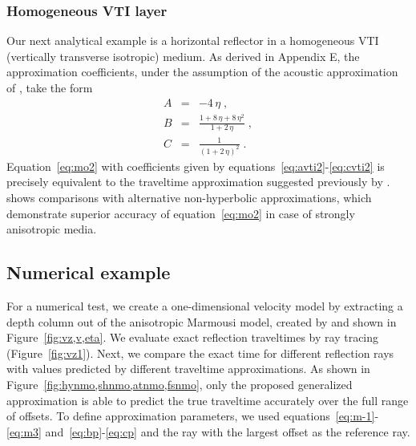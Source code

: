 
\subsubsection{Homogeneous VTI layer}

Our next analytical example is a horizontal reflector in a homogeneous
VTI (vertically transverse isotropic) medium. As derived in Appendix
E, the approximation coefficients, under the assumption of the
acoustic approximation of \cite{GEO63-02-06230631}, take the form
\begin{eqnarray}
\label{eq:avti2}
A & = & -4\,\eta\;, \\
\label{eq:bvti2}
B & = & \frac{1 + 8\,\eta + 8\,\eta^2}{1 + 2\,\eta}\;, \\
\label{eq:cvti2}
C & = & \frac{1}{(1 + 2\,\eta)^2}\;.
\end{eqnarray}
Equation~\ref{eq:mo2} with coefficients given by
equations~\ref{eq:avti2}-\ref{eq:cvti2} is precisely equivalent to the
traveltime approximation suggested previously by
\cite{GPR52-03-02470259}. \cite{GPR52-03-02470259} shows comparisons
with alternative non-hyperbolic approximations, which demonstrate
superior accuracy of equation~\ref{eq:mo2} in case of strongly
anisotropic media.

\subsection{Numerical example}

For a numerical test, we create a one-dimensional velocity model by
extracting a depth column out of the anisotropic Marmousi model,
created by \cite{Alkhalifah.sep.95.tariq3} and shown in
Figure~\ref{fig:vz,v,eta}. We evaluate exact reflection traveltimes by
ray tracing (Figure~\ref{fig:vz1}). Next, we compare the exact time
for different reflection rays with values predicted by different
traveltime approximations. As shown in
Figure~\ref{fig:hynmo,shnmo,atnmo,fsnmo}, only the proposed
generalized approximation is able to predict the true traveltime
accurately over the full range of offsets. To define approximation
parameters, we used equations~\ref{eq:m-1}-\ref{eq:m3}
and~\ref{eq:bp}-\ref{eq:cp} and the ray with the largest offset as the
reference ray.

